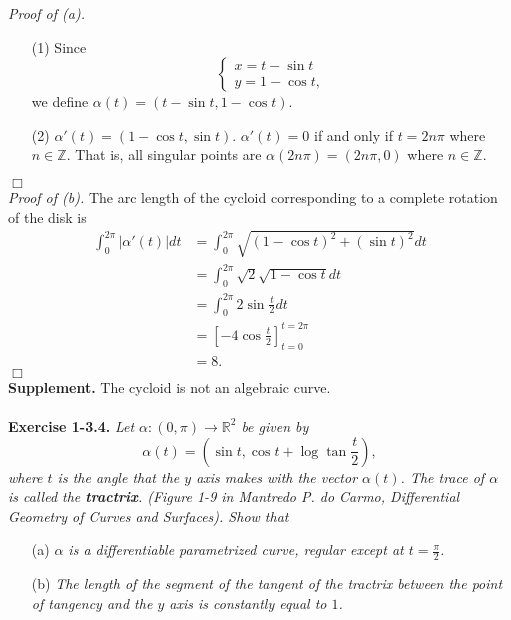 \documentclass{article}
\begin{document}
\emph{Proof of (a).}
\begin{enumerate}
\item[(1)]
Since
\begin{equation*}
  \begin{cases}
     x = t - \sin t \\
     y = 1 - \cos t,
  \end{cases}
\end{equation*}
we define $\alpha(t) = (t - \sin t, 1 - \cos t)$.
\item[(2)]
$\alpha'(t) = (1 - \cos t, \sin t)$.
$\alpha'(t) = 0$ if and only if $t = 2n\pi$ where $n \in \mathbb{Z}$.
That is, all singular points are $\alpha(2n\pi) = (2n\pi, 0)$ where $n \in \mathbb{Z}$.
\end{enumerate}
$\Box$ \\

\emph{Proof of (b).}
The arc length of the cycloid corresponding to a complete rotation of the disk is
\begin{align*}
\int_{0}^{2\pi} |\alpha'(t)| dt
&= \int_{0}^{2\pi} \sqrt{(1-\cos t)^2 + (\sin t)^2} dt \\
&= \int_{0}^{2\pi} \sqrt{2} \sqrt{1 - \cos t} dt \\
&= \int_{0}^{2\pi} 2 \sin \frac{t}{2} dt \\
&= \left[ -4 \cos\frac{t}{2} \right]_{t=0}^{t=2\pi} \\
&= 8.
\end{align*}
$\Box$ \\

\textbf{Supplement.}
The cycloid is not an algebraic curve. \\\\






\textbf{Exercise 1-3.4.}
\emph{Let $\alpha: (0, \pi) \to \mathbb{R}^2$ be given by
$$\alpha(t) = \left(\sin t, \cos t + \log\tan\frac{t}{2}\right),$$
where $t$ is the angle that the $y$ axis makes with the vector $\alpha(t)$.
The trace of $\alpha$ is called the \textbf{tractrix}.
(Figure 1-9 in Mantredo P. do Carmo, Differential Geometry of Curves and Surfaces).
Show that}
\begin{enumerate}
  \item[(a)]
  \emph{$\alpha$ is a differentiable parametrized curve,
  regular except at $t = \frac{\pi}{2}$.}
  \item[(b)]
  \emph{The length of the segment of the tangent of the tractrix between
  the point of tangency and the $y$ axis is constantly equal to $1$.} \\
\end{enumerate}
\end{document}
